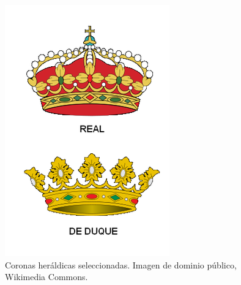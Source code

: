 \begin{itemize}
\begin{figure}[h!]
    \begin{minipage}{0.3\textwidth}
        \centering
        \includegraphics[width=\textwidth]{figuras/coronas.png}
        \caption{Coronas heráldicas seleccionadas. Imagen de dominio público, Wikimedia Commons.}
    \end{minipage}
    \hfill
    \begin{minipage}{0.3\textwidth}
        \centering

\end{minipage}
\end{figure}
\end{itemize}
